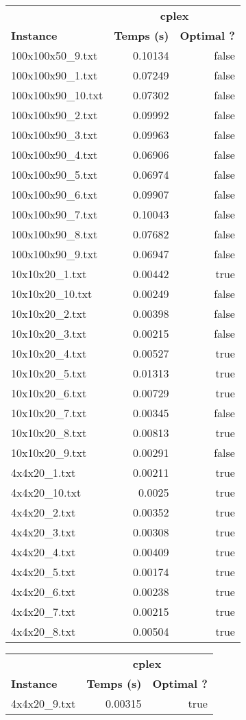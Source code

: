 \documentclass{article}
\begin{document}
\newpage
\begin{center}
\renewcommand{\arraystretch}{1.4} 
 \begin{tabular}{lrr}
	\hline
 & \multicolumn{2}{c}{\textbf{cplex}}\\
\textbf{Instance}  & \textbf{Temps (s)} & \textbf{Optimal ?} \\\hline

100x100x50\_9.txt & 0.10134 & false
\\
100x100x90\_1.txt & 0.07249 & false
\\
100x100x90\_10.txt & 0.07302 & false
\\
100x100x90\_2.txt & 0.09992 & false
\\
100x100x90\_3.txt & 0.09963 & false
\\
100x100x90\_4.txt & 0.06906 & false
\\
100x100x90\_5.txt & 0.06974 & false
\\
100x100x90\_6.txt & 0.09907 & false
\\
100x100x90\_7.txt & 0.10043 & false
\\
100x100x90\_8.txt & 0.07682 & false
\\
100x100x90\_9.txt & 0.06947 & false
\\
10x10x20\_1.txt & 0.00442 & true
\\
10x10x20\_10.txt & 0.00249 & false
\\
10x10x20\_2.txt & 0.00398 & false
\\
10x10x20\_3.txt & 0.00215 & false
\\
10x10x20\_4.txt & 0.00527 & true
\\
10x10x20\_5.txt & 0.01313 & true
\\
10x10x20\_6.txt & 0.00729 & true
\\
10x10x20\_7.txt & 0.00345 & false
\\
10x10x20\_8.txt & 0.00813 & true
\\
10x10x20\_9.txt & 0.00291 & false
\\
4x4x20\_1.txt & 0.00211 & true
\\
4x4x20\_10.txt & 0.0025 & true
\\
4x4x20\_2.txt & 0.00352 & true
\\
4x4x20\_3.txt & 0.00308 & true
\\
4x4x20\_4.txt & 0.00409 & true
\\
4x4x20\_5.txt & 0.00174 & true
\\
4x4x20\_6.txt & 0.00238 & true
\\
4x4x20\_7.txt & 0.00215 & true
\\
4x4x20\_8.txt & 0.00504 & true
\\
\hline\end{tabular}
\end{center}

\newpage
\begin{center}
\renewcommand{\arraystretch}{1.4} 
 \begin{tabular}{lrr}
	\hline
 & \multicolumn{2}{c}{\textbf{cplex}}\\
\textbf{Instance}  & \textbf{Temps (s)} & \textbf{Optimal ?} \\\hline

4x4x20\_9.txt & 0.00315 & true
\\
\hline\end{tabular}
\end{center}
\end{document}
